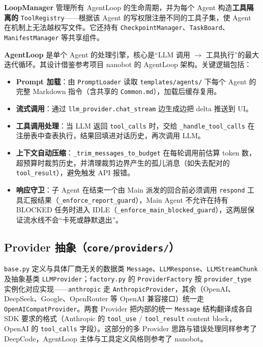 \documentclass[a4paper,11pt]{article}
\begin{document}
\textbf{LoopManager} 管理所有 AgentLoop 的生命周期，并为每个 Agent 构造\textbf{工具隔离的} \texttt{ToolRegistry}——根据该 Agent 的写权限注册不同的工具子集，使 Agent 在机制上无法越权写文件。它还持有 \texttt{CheckpointManager}、\texttt{TaskBoard}、\texttt{ManifestManager} 等共享组件。

\textbf{AgentLoop} 是单个 Agent 的处理引擎，核心是“LLM 调用 $\rightarrow$ 工具执行”的最大迭代循环。其设计借鉴参考项目 nanobot\cite{nanobot} 的 AgentLoop 架构。关键逻辑包括：

\begin{itemize}[leftmargin=1.4em,itemsep=2pt]
  \item \textbf{Prompt 加载}：由 \texttt{PromptLoader} 读取 \texttt{templates/agents/} 下每个 Agent 的完整 Markdown 指令（含共享的 \texttt{Common.md}），加载后缓存复用。
  \item \textbf{流式调用}：通过 \texttt{llm\_provider.chat\_stream} 边生成边把 delta 推送到 UI。
  \item \textbf{工具调用处理}：当 LLM 返回 \texttt{tool\_calls} 时，交给 \texttt{\_handle\_tool\_calls} 在注册表中查表执行，结果回填进对话历史，再次调用 LLM。
  \item \textbf{上下文自动压缩}：\texttt{\_trim\_messages\_to\_budget} 在每轮调用前估算 token 数，超预算时裁剪历史，并清理裁剪边界产生的孤儿消息（如失去配对的 \texttt{tool\_result}），避免触发 API 报错。
  \item \textbf{响应守卫}：子 Agent 在结束一个由 Main 派发的回合前必须调用 \texttt{respond} 工具汇报结果（\texttt{\_enforce\_report\_guard}），Main Agent 不允许在持有 BLOCKED 任务时进入 IDLE（\texttt{\_enforce\_main\_blocked\_guard}），这两层保证流水线不会“卡死或静默退出”。
\end{itemize}

\subsection{Provider 抽象（\texttt{core/providers/}）}

\texttt{base.py} 定义与具体厂商无关的数据类 \texttt{Message}、\texttt{LLMResponse}、\texttt{LLMStreamChunk} 及抽象基类 \texttt{LLMProvider}；\texttt{factory.py} 的 \texttt{ProviderFactory} 按 \texttt{provider\_type} 实例化对应实现——\texttt{anthropic} 走 \texttt{AnthropicProvider}，其余（OpenAI、DeepSeek、Google、OpenRouter 等 OpenAI 兼容接口）统一走 \texttt{OpenAICompatProvider}。两套 Provider 把内部的统一 \texttt{Message} 结构翻译成各自 SDK 要求的格式（Anthropic 的 \texttt{tool\_use} / \texttt{tool\_result} content block，OpenAI 的 \texttt{tool\_calls} 字段）。这部分的多 Provider 思路与错误处理同样参考了 DeepCode\cite{deepcode}，AgentLoop 主体与工具定义风格则参考了 nanobot\cite{nanobot}。
\end{document}
